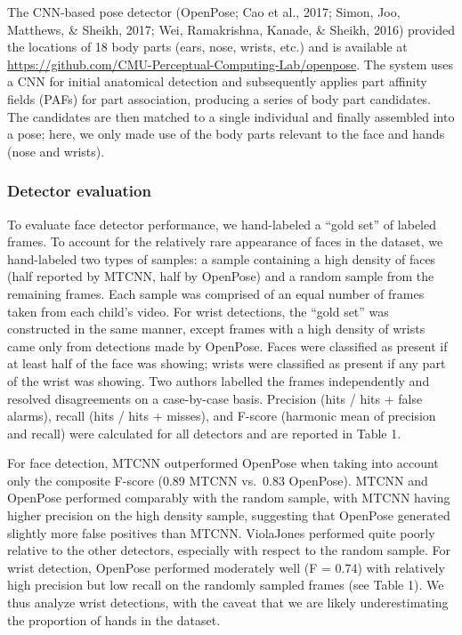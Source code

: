 \documentclass[english,man,floatsintext]{apa6}
\begin{document}
The CNN-based pose detector (OpenPose; Cao et al., 2017; Simon, Joo,
Matthews, \& Sheikh, 2017; Wei, Ramakrishna, Kanade, \& Sheikh, 2016)
provided the locations of 18 body parts (ears, nose, wrists, etc.) and
is available at
\url{https://github.com/CMU-Perceptual-Computing-Lab/openpose}. The
system uses a CNN for initial anatomical detection and subsequently
applies part affinity fields (PAFs) for part association, producing a
series of body part candidates. The candidates are then matched to a
single individual and finally assembled into a pose; here, we only made
use of the body parts relevant to the face and hands (nose and wrists).

\subsubsection{Detector evaluation}\label{detector-evaluation}

To evaluate face detector performance, we hand-labeled a \enquote{gold
set} of labeled frames. To account for the relatively rare appearance of
faces in the dataset, we hand-labeled two types of samples: a sample
containing a high density of faces (half reported by MTCNN, half by
OpenPose) and a random sample from the remaining frames. Each sample was
comprised of an equal number of frames taken from each child's video.
For wrist detections, the \enquote{gold set} was constructed in the same
manner, except frames with a high density of wrists came only from
detections made by OpenPose. Faces were classified as present if at
least half of the face was showing; wrists were classified as present if
any part of the wrist was showing. Two authors labelled the frames
independently and resolved disagreements on a case-by-case basis.
Precision (hits / hits + false alarms), recall (hits / hits + misses),
and F-score (harmonic mean of precision and recall) were calculated for
all detectors and are reported in Table 1.

For face detection, MTCNN outperformed OpenPose when taking into account
only the composite F-score (0.89 MTCNN vs.~0.83 OpenPose). MTCNN and
OpenPose performed comparably with the random sample, with MTCNN having
higher precision on the high density sample, suggesting that OpenPose
generated slightly more false positives than MTCNN. ViolaJones performed
quite poorly relative to the other detectors, especially with respect to
the random sample. For wrist detection, OpenPose performed moderately
well (F = 0.74) with relatively high precision but low recall on the
randomly sampled frames (see Table 1). We thus analyze wrist detections,
with the caveat that we are likely underestimating the proportion of
hands in the dataset.
\end{document}
